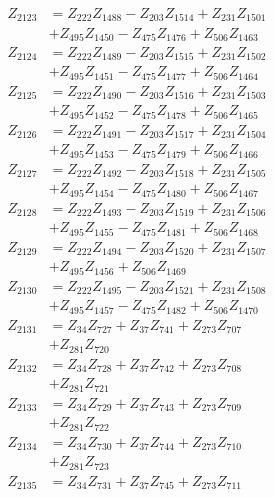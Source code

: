 \begin{multicols}{2}
\begin{align}
Z_{2123} &= Z_{222}Z_{1488} - Z_{203}Z_{1514} + Z_{231}Z_{1501}  \nonumber \\
&+ Z_{495}Z_{1450} - Z_{475}Z_{1476} + Z_{506}Z_{1463} \nonumber \\
Z_{2124} &= Z_{222}Z_{1489} - Z_{203}Z_{1515} + Z_{231}Z_{1502}  \nonumber \\
&+ Z_{495}Z_{1451} - Z_{475}Z_{1477} + Z_{506}Z_{1464} \nonumber \\
Z_{2125} &= Z_{222}Z_{1490} - Z_{203}Z_{1516} + Z_{231}Z_{1503}  \nonumber \\
&+ Z_{495}Z_{1452} - Z_{475}Z_{1478} + Z_{506}Z_{1465} \nonumber \\
Z_{2126} &= Z_{222}Z_{1491} - Z_{203}Z_{1517} + Z_{231}Z_{1504}  \nonumber \\
&+ Z_{495}Z_{1453} - Z_{475}Z_{1479} + Z_{506}Z_{1466} \nonumber \\
Z_{2127} &= Z_{222}Z_{1492} - Z_{203}Z_{1518} + Z_{231}Z_{1505}  \nonumber \\
&+ Z_{495}Z_{1454} - Z_{475}Z_{1480} + Z_{506}Z_{1467} \nonumber \\
Z_{2128} &= Z_{222}Z_{1493} - Z_{203}Z_{1519} + Z_{231}Z_{1506}  \nonumber \\
&+ Z_{495}Z_{1455} - Z_{475}Z_{1481} + Z_{506}Z_{1468} \nonumber \\
Z_{2129} &= Z_{222}Z_{1494} - Z_{203}Z_{1520} + Z_{231}Z_{1507}  \nonumber \\
&+ Z_{495}Z_{1456} + Z_{506}Z_{1469} \nonumber \\
Z_{2130} &= Z_{222}Z_{1495} - Z_{203}Z_{1521} + Z_{231}Z_{1508}  \nonumber \\
&+ Z_{495}Z_{1457} - Z_{475}Z_{1482} + Z_{506}Z_{1470} \nonumber \\
Z_{2131} &= Z_{34}Z_{727} + Z_{37}Z_{741} + Z_{273}Z_{707}  \nonumber \\
&+ Z_{281}Z_{720} \nonumber \\
Z_{2132} &= Z_{34}Z_{728} + Z_{37}Z_{742} + Z_{273}Z_{708}  \nonumber \\
&+ Z_{281}Z_{721} \nonumber \\
Z_{2133} &= Z_{34}Z_{729} + Z_{37}Z_{743} + Z_{273}Z_{709}  \nonumber \\
&+ Z_{281}Z_{722} \nonumber \\
Z_{2134} &= Z_{34}Z_{730} + Z_{37}Z_{744} + Z_{273}Z_{710}  \nonumber \\
&+ Z_{281}Z_{723} \nonumber \\
Z_{2135} &= Z_{34}Z_{731} + Z_{37}Z_{745} + Z_{273}Z_{711}  \nonumber \\

\end{align}
\end{multicols}
